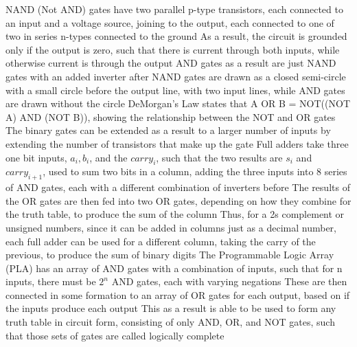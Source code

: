 \documentclass[11 pt, twoside]{article}
\newenvironment{outline*}
{
	\begin{outline}[enumerate]
	}
	{\end{outline}
}
\begin{document}
\begin{outline*}
\2 NAND (Not AND) gates have two parallel p-type transistors, each connected to an input and a voltage source, joining to the output, each connected to one of two in series n-types connected to the ground
\3 As a result, the circuit is grounded only if the output is zero, such that there is current through both inputs, while otherwise current is through the output
\3 AND gates as a result are just NAND gates with an added inverter after
\3 NAND gates are drawn as a closed semi-circle with a small circle before the output line, with two input lines, while AND gates are drawn without the circle
\2 DeMorgan's Law states that A OR B = NOT((NOT A) AND (NOT B)), showing the relationship between the NOT and OR gates
\2 The binary gates can be extended as a result to a larger number of inputs by extending the number of transistors that make up the gate
\2 Full adders take three one bit inputs, $a_i, b_i$, and the $carry_i$, such that the two results are $s_i$ and $carry_{i + 1}$, used to sum two bits in a column, adding the three inputs into 8 series of AND gates, each with a different combination of inverters before
\3 The results of the OR gates are then fed into two OR gates, depending on how they combine for the truth table, to produce the sum of the column
\3 Thus, for a 2s complement or unsigned numbers, since it can be added in columns just as a decimal number, each full adder can be used for a different column, taking the carry of the previous, to produce the sum of binary digits
\2 The Programmable Logic Array (PLA) has an array of AND gates with a combination of inputs, such that for n inputs, there must be $2^n$ AND gates, each with varying negations
\3 These are then connected in some formation to an array of OR gates for each output, based on if the inputs produce each output
\3 This as a result is able to be used to form any truth table in circuit form, consisting of only AND, OR, and NOT gates, such that those sets of gates are called logically complete
\end{outline*}
\end{document}
